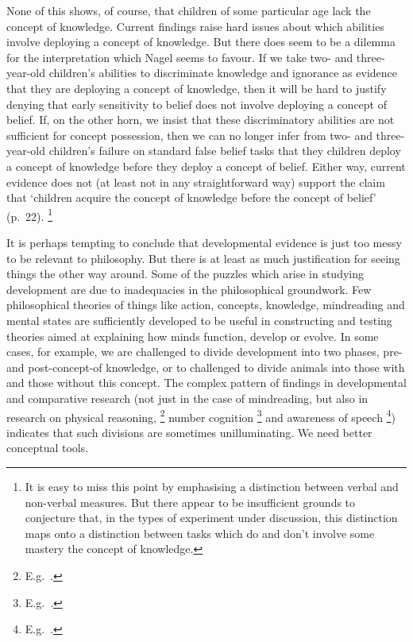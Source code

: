 \documentclass[11pt,a4paper]{extarticle}
\begin{document}
None of this shows, of course, that children of some particular age lack the concept of knowledge.
Current findings raise hard issues about which abilities involve deploying a concept of knowledge.
But there does seem to be a dilemma for the interpretation which Nagel seems to favour.
If we take two- and three-year-old children's abilities to discriminate knowledge and ignorance as evidence that they are deploying a concept of knowledge,
then it will be hard to justify denying that early sensitivity to belief does not involve deploying a concept of belief.
If, on the other horn, we insist that these discriminatory abilities are not sufficient for concept possession,
then we can no longer infer from two- and three-year-old children's failure on standard false belief tasks that they children deploy a concept of knowledge before they deploy a concept of belief.
Either way, current evidence does not 
(at least not in any straightforward way)
support the claim that `children acquire the concept of knowledge before the concept of belief' (p.\ 22).%
\footnote{
It is easy to miss this point by emphasising a distinction between verbal and non-verbal measures.
But there appear to be insufficient grounds to conjecture that, in the types of experiment under discussion, this distinction maps onto a distinction between tasks which do and don't involve some mastery the concept of knowledge.
}

It is perhaps tempting to conclude that developmental evidence is just too messy to be relevant to philosophy.
But there is at least as much justification for seeing things the other way around.
Some of the puzzles which arise in studying development are due to inadequacies in the philosophical groundwork.
Few philosophical theories of things like action, concepts, knowledge, mindreading and mental states are sufficiently developed to be useful in constructing and testing theories aimed at explaining 
 how minds function, develop or evolve.
In some cases, for example, we are challenged to divide development into two phases, pre- and post-concept-of knowledge, or to challenged to divide animals into those with and those without this concept.
The complex pattern of findings in developmental and comparative research (not just in the case of mindreading, but also in research on physical reasoning,%
\footnote{
E.g.\ \citet{Berthier:2000eu,Baillargeon:2002hb,Hood:2003yg}.
}
number cognition%
\footnote{
E.g.\ \citet{Xu:2003qw,feigenson_limits_2005,gallistel_non-verbal_2000,gelman_number_2005}.
}
and awareness of speech%
\footnote{
E.g.\ \citet{Eimas:1971cp,Jusczyk:1995it,Anthony:2004yp,Liberman:1990mo}.
}) 
indicates that such divisions are sometimes unilluminating.
We need better conceptual tools.
\end{document}
